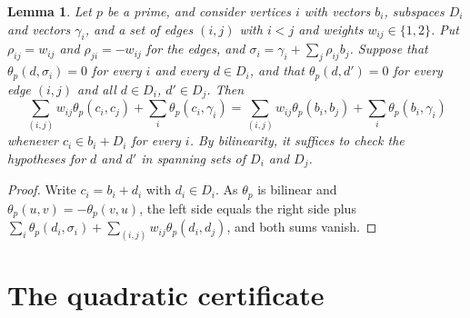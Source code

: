 \documentclass[11pt]{article}
\newtheorem{lemma}[theorem]{Lemma}
\begin{document}
\begin{lemma}\label{lem:cenvelope}
Let $p$ be a prime, and consider vertices $i$ with vectors $b_i$, subspaces $D_i$ and vectors $\gamma_i$, and a set of edges $(i,j)$ with $i<j$ and weights $w_{ij}\in\{1,2\}$. Put $\rho_{ij}=w_{ij}$ and $\rho_{ji}=-w_{ij}$ for the edges, and $\sigma_i=\gamma_i+\sum_j\rho_{ij}b_j$. Suppose that $\theta_p(d,\sigma_i)=0$ for every $i$ and every $d\in D_i$, and that $\theta_p(d,d')=0$ for every edge $(i,j)$ and all $d\in D_i$, $d'\in D_j$. Then
\[
\sum_{(i,j)}w_{ij}\theta_p(c_i,c_j)+\sum_i\theta_p(c_i,\gamma_i)=\sum_{(i,j)}w_{ij}\theta_p(b_i,b_j)+\sum_i\theta_p(b_i,\gamma_i)
\]
whenever $c_i\in b_i+D_i$ for every $i$. By bilinearity, it suffices to check the hypotheses for $d$ and $d'$ in spanning sets of $D_i$ and $D_j$.
\end{lemma}

\begin{proof}
Write $c_i=b_i+d_i$ with $d_i\in D_i$. As $\theta_p$ is bilinear and $\theta_p(u,v)=-\theta_p(v,u)$, the left side equals the right side plus $\sum_i\theta_p(d_i,\sigma_i)+\sum_{(i,j)}w_{ij}\theta_p(d_i,d_j)$, and both sums vanish.
\end{proof}

\section{The quadratic certificate}
\end{document}
